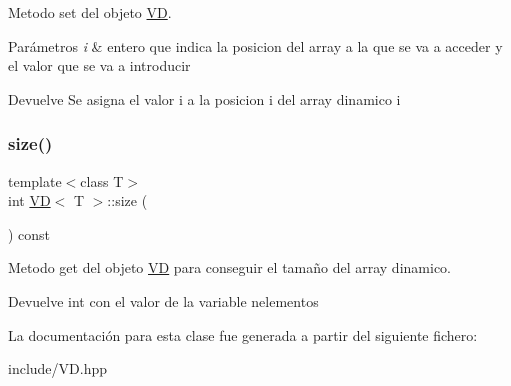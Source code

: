 Metodo set del objeto \hyperlink{classVD}{VD}. 


\begin{DoxyParams}{Parámetros}
{\em i} & entero que indica la posicion del array a la que se va a acceder y el valor que se va a introducir \\
\hline
\end{DoxyParams}
\begin{DoxyReturn}{Devuelve}
Se asigna el valor i a la posicion i del array dinamico i 
\end{DoxyReturn}
\mbox{\label{classVD_a411ad026db1c8e0617d9031f1f1017a5}} 
\subsubsection{\texorpdfstring{size()}{size()}}
{\footnotesize\ttfamily template$<$class T$>$ \\
int \hyperlink{classVD}{VD}$<$ T $>$\+::size (\begin{DoxyParamCaption}{ }\end{DoxyParamCaption}) const\hspace{0.3cm}{\ttfamily [inline]}}



Metodo get del objeto \hyperlink{classVD}{VD} para conseguir el tamaño del array dinamico. 

\begin{DoxyReturn}{Devuelve}
int con el valor de la variable nelementos 
\end{DoxyReturn}


La documentación para esta clase fue generada a partir del siguiente fichero\+:\begin{DoxyCompactItemize}
\item 
include/V\+D.\+hpp\end{DoxyCompactItemize}
